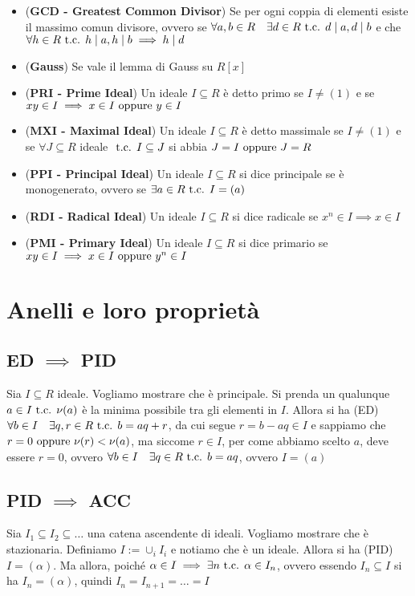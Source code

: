 \documentclass[a4paper,GeneralMath,NoNotes]{stdmdoc}
\begin{document}
\begin{itemize}
		\item ({\bf GCD - Greatest Common Divisor}) Se per ogni coppia di elementi esiste il massimo comun divisore, ovvero se $\forall a, b \in R \quad \exists d \in R \mbox{ t.c. } d \mid a, d \mid b$ e che $\forall h \in R \mbox{ t.c. } h \mid a, h \mid b \implies h \mid d$
		\item ({\bf Gauss}) Se vale il lemma di Gauss su $R[x]$
		\item ({\bf PRI - Prime Ideal}) Un ideale $I \subseteq R$ è detto primo se $I \neq (1)$ e se $xy \in I \implies x \in I \text{ oppure } y \in I$
		\item ({\bf MXI - Maximal Ideal}) Un ideale $I \subseteq R$ è detto massimale se $I \neq (1)$ e se $\forall J \subseteq R$ ideale $\mbox{ t.c. } I \subseteq J$ si abbia $J = I \text{ oppure } J = R$
		\item ({\bf PPI - Principal Ideal}) Un ideale $I \subseteq R$ si dice principale se è monogenerato, ovvero se $\exists a \in R \mbox{ t.c. } I = (a)$
		\item ({\bf RDI - Radical Ideal}) Un ideale $I \subseteq R$ si dice radicale se $x^n \in I \implies x \in I$
		\item ({\bf PMI - Primary Ideal}) Un ideale $I \subseteq R$ si dice primario se $xy \in I \implies x \in I \text{ oppure } y^n \in I$
	\end{itemize}

	\section*{Anelli e loro proprietà}
	\subsection{ED $\implies$ PID}
	Sia $I \subseteq R$ ideale. Vogliamo mostrare che è principale. Si prenda un qualunque $a \in I \mbox{ t.c. } \nu(a)$ è la minima possibile tra gli elementi in $I$. Allora si ha (ED) $\forall b \in I \quad \exists q,r \in R \mbox{ t.c. } b = aq + r$, da cui segue $r = b - aq \in I$ e sappiamo che $r = 0 \text{ oppure } \nu(r) < \nu(a)$, ma siccome $r \in I$, per come abbiamo scelto $a$, deve essere $r = 0$, ovvero $\forall b \in I \quad \exists q \in R \mbox{ t.c. } b = aq$, ovvero $I = (a)$
	
	\subsection{PID $\implies$ ACC}
	Sia $I_1 \subseteq I_2 \subseteq \ldots$ una catena ascendente di ideali. Vogliamo mostrare che è stazionaria. Definiamo $I := \cup_{i} I_i$ e notiamo che è un ideale. Allora si ha (PID) $I = (\alpha)$. Ma allora, poiché $\alpha \in I \implies \exists n \mbox{ t.c. } \alpha \in I_n$, ovvero essendo $I_n \subseteq I$ si ha $I_n = (\alpha)$, quindi $I_n = I_{n+1} = \ldots = I$
\end{document}
